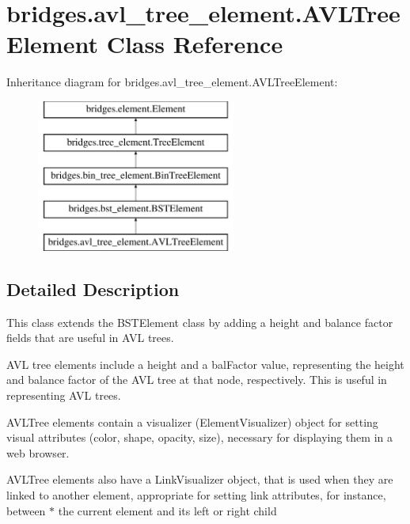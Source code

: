 \hypertarget{classbridges_1_1avl__tree__element_1_1_a_v_l_tree_element}{}\section{bridges.\+avl\+\_\+tree\+\_\+element.\+A\+V\+L\+Tree\+Element Class Reference}
\label{classbridges_1_1avl__tree__element_1_1_a_v_l_tree_element}
Inheritance diagram for bridges.\+avl\+\_\+tree\+\_\+element.\+A\+V\+L\+Tree\+Element\+:\begin{figure}[H]
\begin{center}
\leavevmode
\includegraphics[height=5.000000cm]{classbridges_1_1avl__tree__element_1_1_a_v_l_tree_element}
\end{center}
\end{figure}


\subsection{Detailed Description}
This class extends the B\+S\+T\+Element class by adding a height and balance factor fields that are useful in A\+VL trees. 

A\+VL tree elements include a \textquotesingle{}height\textquotesingle{} and a \textquotesingle{}bal\+Factor\textquotesingle{} value, representing the height and balance factor of the A\+VL tree at that node, respectively. This is useful in representing A\+VL trees.

A\+V\+L\+Tree elements contain a visualizer (Element\+Visualizer) object for setting visual attributes (color, shape, opacity, size), necessary for displaying them in a web browser.

A\+V\+L\+Tree elements also have a Link\+Visualizer object, that is used when they are linked to another element, appropriate for setting link attributes, for instance, between $\ast$ the current element and its left or right child

